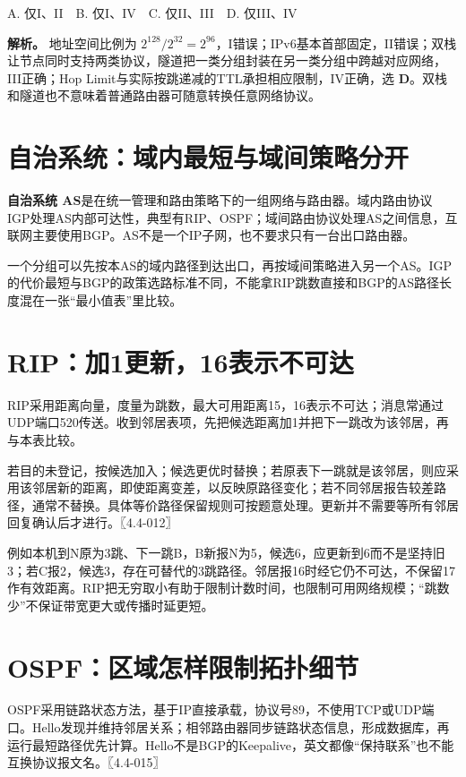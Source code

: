 A. 仅I、II　B. 仅I、IV　C. 仅II、III　D. 仅III、IV


\textbf{解析。} 地址空间比例为 \(2^{128}/2^{32}=2^{96}\)，I错误；IPv6基本首部固定，II错误；双栈让节点同时支持两类协议，隧道把一类分组封装在另一类分组中跨越对应网络，III正确；Hop Limit与实际按跳递减的TTL承担相应限制，IV正确，选 \textbf{D}。双栈和隧道也不意味着普通路由器可随意转换任意网络协议。

\section{自治系统：域内最短与域间策略分开}\label{cn-04-15}

\textbf{自治系统 AS}是在统一管理和路由策略下的一组网络与路由器。域内路由协议 IGP处理AS内部可达性，典型有RIP、OSPF；域间路由协议处理AS之间信息，互联网主要使用BGP。AS不是一个IP子网，也不要求只有一台出口路由器。

一个分组可以先按本AS的域内路径到达出口，再按域间策略进入另一个AS。IGP的代价最短与BGP的政策选路标准不同，不能拿RIP跳数直接和BGP的AS路径长度混在一张``最小值表''里比较。

\section{RIP：加1更新，16表示不可达}\label{cn-04-16}

RIP采用距离向量，度量为跳数，最大可用距离15，16表示不可达；消息常通过UDP端口520传送。收到邻居表项，先把候选距离加1并把下一跳改为该邻居，再与本表比较。

若目的未登记，按候选加入；候选更优时替换；若原表下一跳就是该邻居，则应采用该邻居新的距离，即使距离变差，以反映原路径变化；若不同邻居报告较差路径，通常不替换。具体等价路径保留规则可按题意处理。更新并不需要等所有邻居回复确认后才进行。〖4.4-012〗

例如本机到N原为3跳、下一跳B，B新报N为5，候选6，应更新到6而不是坚持旧3；若C报2，候选3，存在可替代的3跳路径。邻居报16时经它仍不可达，不保留17作有效距离。RIP把无穷取小有助于限制计数时间，也限制可用网络规模；``跳数少''不保证带宽更大或传播时延更短。

\section{OSPF：区域怎样限制拓扑细节}\label{cn-04-17}

OSPF采用链路状态方法，基于IP直接承载，协议号89，不使用TCP或UDP端口。Hello发现并维持邻居关系；相邻路由器同步链路状态信息，形成数据库，再运行最短路径优先计算。Hello不是BGP的Keepalive，英文都像``保持联系''也不能互换协议报文名。〖4.4-015〗

